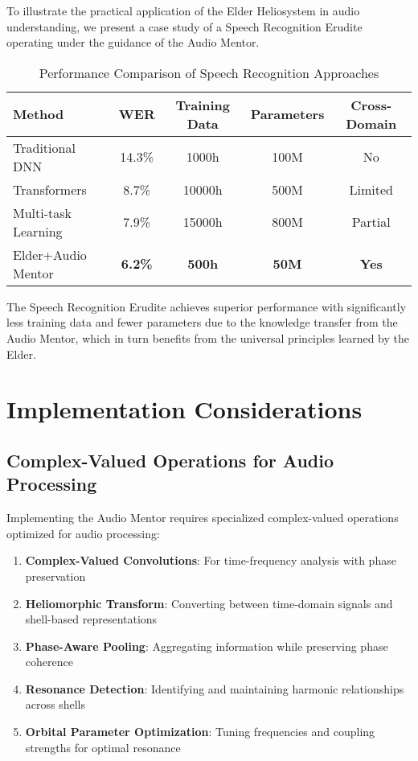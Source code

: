 To illustrate the practical application of the Elder Heliosystem in audio understanding, we present a case study of a Speech Recognition Erudite operating under the guidance of the Audio Mentor.

\begin{table}[h]
\centering
\caption{Performance Comparison of Speech Recognition Approaches}
\label{tab:speech_recognition}
\begin{tabular}{|l|c|c|c|c|}
\hline
\textbf{Method} & \textbf{WER} & \textbf{Training Data} & \textbf{Parameters} & \textbf{Cross-Domain} \\
\hline
Traditional DNN & 14.3\% & 1000h & 100M & No \\
\hline
Transformers & 8.7\% & 10000h & 500M & Limited \\
\hline
Multi-task Learning & 7.9\% & 15000h & 800M & Partial \\
\hline
Elder+Audio Mentor & \textbf{6.2\%} & \textbf{500h} & \textbf{50M} & \textbf{Yes} \\
\hline
\end{tabular}
\end{table}

The Speech Recognition Erudite achieves superior performance with significantly less training data and fewer parameters due to the knowledge transfer from the Audio Mentor, which in turn benefits from the universal principles learned by the Elder.

\section{Implementation Considerations}

\subsection{Complex-Valued Operations for Audio Processing}

Implementing the Audio Mentor requires specialized complex-valued operations optimized for audio processing:

\begin{enumerate}
    \item \textbf{Complex-Valued Convolutions}: For time-frequency analysis with phase preservation
    \item \textbf{Heliomorphic Transform}: Converting between time-domain signals and shell-based representations
    \item \textbf{Phase-Aware Pooling}: Aggregating information while preserving phase coherence
    \item \textbf{Resonance Detection}: Identifying and maintaining harmonic relationships across shells
    \item \textbf{Orbital Parameter Optimization}: Tuning frequencies and coupling strengths for optimal resonance
\end{enumerate}

